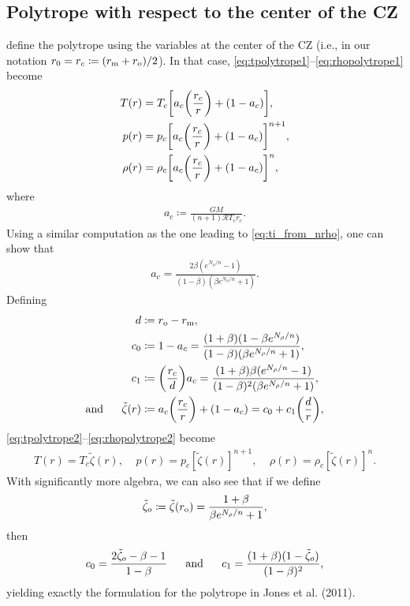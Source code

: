 \documentclass[12pt]{article} %
\newcommand{\rrm}{r_{\rm{m}}}
\newcommand{\tz}{\tilde{\zeta}}
\begin{document}
\subsection{Polytrope with respect to the center of the CZ}
\citet{Jones11} define the polytrope using the variables at the center of the CZ (i.e., in our notation $r_0=r_c\coloneqq(\rrm+r_{\rm{o}})/2$). In that case, \eqref{eq:tpolytrope1}--\eqref{eq:rhopolytrope1} become
\begin{align}
	T(r) &= T_c\bigg{[}a_c\bigg{(}\frac{r_c}{r}\bigg{)} + (1 - a_c)\bigg{]},\label{eq:tpolytrope2}\\
	p(r) &= p_c\bigg{[}a_c\bigg{(}\frac{r_c}{r}\bigg{)} + (1 - a_c)\bigg{]}^{n+1},\label{eq:ppolytrope2}\\
	\rho(r) &= \rho_c\bigg{[}a_c\bigg{(}\frac{r_c}{r}\bigg{)} + (1 - a_c)\bigg{]}^n,\label{eq:rhopolytrope2}
\end{align} 
where 
\begin{align}
a_c \coloneqq \frac{GM}{(n+1)\mathcal{R}T_c r_c}.
\label{def:ac}
\end{align}
Using a similar computation as the one leading to \eqref{eq:ti_from_nrho}, one can show that 
\begin{align}
a_c = \frac{2\beta(e^{N_\rho/n}-1)}{(1-\beta)(\beta e^{N_\rho/n} + 1)}.
\label{eq:ac_fromn}
\end{align}
Defining 
\begin{align}
d&\coloneqq r_{\rm{o}}-\rrm,\label{def:d}\\
c_0&\coloneqq 1-a_c = \frac{(1+\beta)(1-\beta e^{N_\rho/n})}{(1-\beta)(\beta e^{N_\rho/n} + 1)}, \label{def:c0}\\
c_1&\coloneqq \bigg{(}\frac{r_c}{d}\bigg{)}a_c = \frac{(1+\beta)\beta(e^{N_\rho/n}-1)}{(1-\beta)^2(\beta e^{N_\rho/n} + 1)},\label{def:c1}\\
\andd \tz(r) &\coloneqq a_c\bigg{(}\frac{r_c}{r}\bigg{)} + (1-a_c) = c_0 + c_1\bigg{(}\frac{d}{r}\bigg{)},\label{def:tildezeta}
\end{align}
\eqref{eq:tpolytrope2}--\eqref{eq:rhopolytrope2} become
\begin{align}
T(r)=T_c\tz(r),\ \ \ \ \ p(r)=p_c[\tz(r)]^{n+1},\ \ \ \ \ \rho(r)=\rho_c[\tz(r)]^n. 
\label{eq:polytrope3}
\end{align}
With significantly more algebra, we can also see that if we define
\begin{align}
\tz_o \coloneqq \tz(r_{\rm{o}}) = \frac{1+\beta}{\beta e^{N_\rho/n} + 1}, 
\end{align}
then 
\begin{align}
c_0 = \frac{2\tz_o - \beta - 1}{1-\beta} \ \ \ \ \ \andd c_1 = \frac{(1+\beta)(1-\tz_o)}{(1-\beta)^2},
\label{eq:c01_from_zeta0}
\end{align}
yielding exactly the formulation for the polytrope in Jones et al. (2011). 
\end{document}
